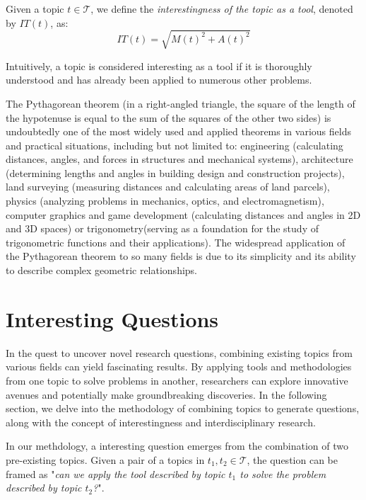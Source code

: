 \begin{definition}
Given a topic $t \in \mathcal{T}$, we define the \emph{interestingness of the topic as a tool}, denoted by $IT(t)$, as:
\[
IT(t) = \sqrt{ M(t)^2 +  A(t)^2 }
\]
\end{definition}

Intuitively, a topic is considered interesting as a tool if it is thoroughly understood and has already been applied to numerous other problems.

\begin{example}
The Pythagorean theorem (in a right-angled triangle, the square of the length of the hypotenuse is equal to the sum of the squares of the other two sides) is undoubtedly one of the most widely used and applied theorems in various fields and practical situations, including but not limited to: engineering (calculating distances, angles, and forces in structures and mechanical systems), architecture (determining lengths and angles in building design and construction projects), land surveying (measuring distances and calculating areas of land parcels), physics (analyzing problems in mechanics, optics, and electromagnetism), computer graphics and game development (calculating distances and angles in 2D and 3D spaces) or trigonometry(serving as a foundation for the study of trigonometric functions and their applications). The widespread application of the Pythagorean theorem to so many fields is due to its simplicity and its ability to describe complex geometric relationships.
\end{example}


%
%

\section{Interesting Questions}

In the quest to uncover novel research questions, combining existing topics from various fields can yield fascinating results. By applying tools and methodologies from one topic to solve problems in another, researchers can explore innovative avenues and potentially make groundbreaking discoveries. In the following section, we delve into the methodology of combining topics to generate questions, along with the concept of interestingness and interdisciplinary research.

In our methdology, a interesting question emerges from the combination of two pre-existing topics. Given a pair of a topics in $t_1, t_2 \in \mathcal{T}$, the question can be framed as "\emph{can we apply the tool described by topic $t_1$ to solve the problem described by topic $t_2$?}".

